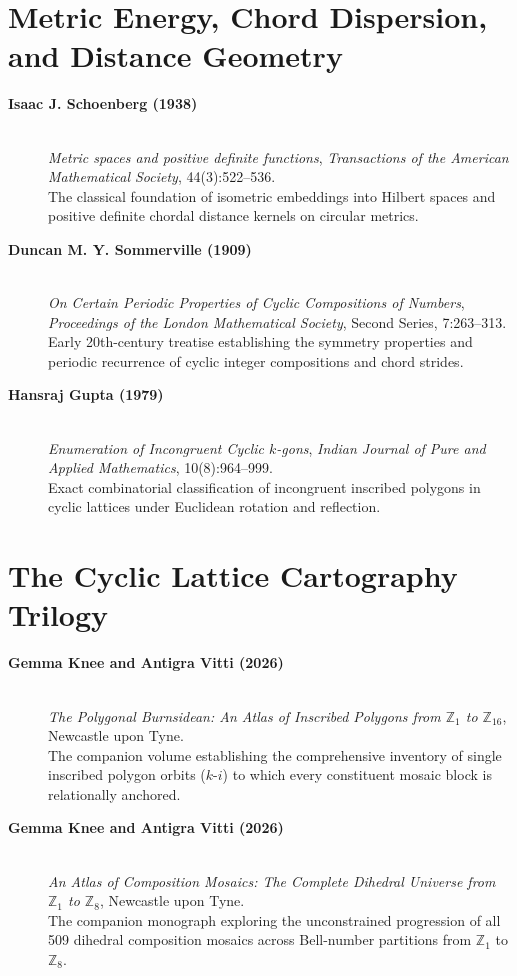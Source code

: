 \section*{Metric Energy, Chord Dispersion, and Distance Geometry}

\begin{description}
    \item[\textbf{Isaac J. Schoenberg (1938)}]\mbox{}\\
    \emph{Metric spaces and positive definite functions}, \emph{Transactions of the American Mathematical Society}, 44(3):522--536.\\
    The classical foundation of isometric embeddings into Hilbert spaces and positive definite chordal distance kernels on circular metrics.

    \item[\textbf{Duncan M. Y. Sommerville (1909)}]\mbox{}\\
    \emph{On Certain Periodic Properties of Cyclic Compositions of Numbers}, \emph{Proceedings of the London Mathematical Society}, Second Series, 7:263--313.\\
    Early 20th-century treatise establishing the symmetry properties and periodic recurrence of cyclic integer compositions and chord strides.

    \item[\textbf{Hansraj Gupta (1979)}]\mbox{}\\
    \emph{Enumeration of Incongruent Cyclic $k$-gons}, \emph{Indian Journal of Pure and Applied Mathematics}, 10(8):964--999.\\
    Exact combinatorial classification of incongruent inscribed polygons in cyclic lattices under Euclidean rotation and reflection.
\end{description}

\section*{The Cyclic Lattice Cartography Trilogy}

\begin{description}
    \item[\textbf{Gemma Knee and Antigra Vitti (2026)}]\mbox{}\\
    \emph{The Polygonal Burnsidean: An Atlas of Inscribed Polygons from $\mathbb{Z}_1$ to $\mathbb{Z}_{16}$}, Newcastle upon Tyne.\\
    The companion volume establishing the comprehensive inventory of single inscribed polygon orbits ($k\text{-}i$) to which every constituent mosaic block is relationally anchored.

    \item[\textbf{Gemma Knee and Antigra Vitti (2026)}]\mbox{}\\
    \emph{An Atlas of Composition Mosaics: The Complete Dihedral Universe from $\mathbb{Z}_1$ to $\mathbb{Z}_8$}, Newcastle upon Tyne.\\
    The companion monograph exploring the unconstrained progression of all 509 dihedral composition mosaics across Bell-number partitions from $\mathbb{Z}_1$ to $\mathbb{Z}_8$.
\end{description}

